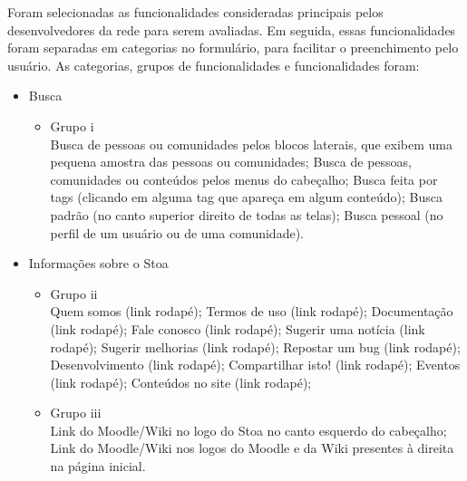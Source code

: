 	Foram selecionadas as funcionalidades consideradas principais pelos desenvolvedores da rede para serem avaliadas. Em seguida, essas funcionalidades foram separadas em categorias no formulário, para facilitar o preenchimento pelo usuário. As categorias, grupos de funcionalidades e funcionalidades foram: 
\begin{itemize}
\item Busca \\
    \begin{itemize}
    \item Grupo i\\
    Busca de pessoas ou comunidades pelos blocos laterais, que exibem uma pequena amostra das pessoas ou comunidades; Busca de pessoas, comunidades ou conteúdos pelos menus do cabeçalho; Busca feita por tags (clicando em alguma tag que apareça em algum conteúdo); Busca padrão (no canto superior direito de todas as telas); Busca pessoal (no perfil de um usuário ou de uma comunidade).
    \end{itemize}

\item Informações sobre o Stoa \\
    \begin{itemize}
    \item Grupo ii\\
    Quem somos (link rodapé); Termos de uso (link rodapé); Documentação (link rodapé); Fale conosco (link rodapé); Sugerir uma notícia (link rodapé); Sugerir melhorias (link rodapé); Repostar um bug (link rodapé); Desenvolvimento (link rodapé); Compartilhar isto! (link rodapé); Eventos (link rodapé); Conteúdos no site (link rodapé);
    \item Grupo iii\\
    Link do Moodle/Wiki no logo do Stoa no canto esquerdo do cabeçalho; Link do Moodle/Wiki nos logos do Moodle e da Wiki presentes à direita na página inicial.
    \end{itemize}


\end{itemize}
